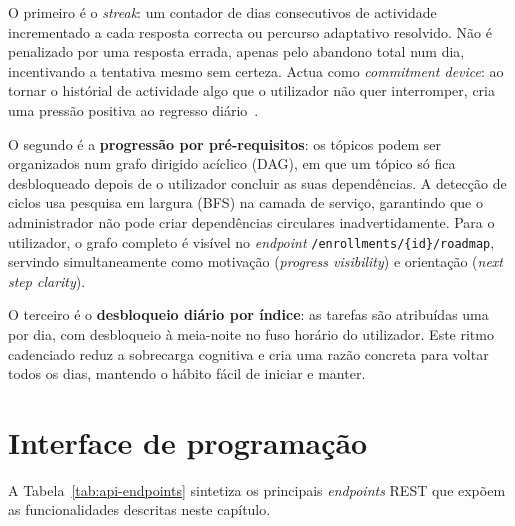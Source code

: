 O primeiro \'e o \emph{streak}: um contador de dias consecutivos de actividade
incrementado a cada resposta correcta ou percurso adaptativo resolvido. N\~ao
\'e penalizado por uma resposta errada, apenas pelo abandono total num dia,
incentivando a tentativa mesmo sem certeza. Actua como \emph{commitment device}:
ao tornar o hist\'orial de actividade algo que o utilizador n\~ao quer
interromper, cria uma press\~ao positiva ao regresso di\'ario~\cite{ott2019gamification}.

O segundo \'e a \textbf{progress\~ao por pr\'e-requisitos}: os t\'opicos
podem ser organizados num grafo dirigido ac\'iclico (DAG), em que um t\'opico
s\'o fica desbloqueado depois de o utilizador concluir as suas depend\^encias.
A detec\c{c}\~ao de ciclos usa pesquisa em largura (BFS) na camada de servi\c{c}o,
garantindo que o administrador n\~ao pode criar depend\^encias circulares
inadvertidamente. Para o utilizador, o grafo completo \'e vis\'ivel no
\emph{endpoint} \texttt{/enrollments/\{id\}/roadmap}, servindo simultaneamente
como motiva\c{c}\~ao (\emph{progress visibility}) e orienta\c{c}\~ao
(\emph{next step clarity}).

O terceiro \'e o \textbf{desbloqueio di\'ario por \'indice}: as tarefas s\~ao
atribu\'idas uma por dia, com desbloqueio \`a meia-noite no fuso hor\'ario do
utilizador. Este ritmo cadenciado reduz a sobrecarga cognitiva e cria uma
raz\~ao concreta para voltar todos os dias, mantendo o h\'abito f\'acil de
iniciar e manter.

\section{Interface de programa\c{c}\~ao}
\label{sec:api}

A Tabela~\ref{tab:api-endpoints} sintetiza os principais \emph{endpoints}
REST que exp\~oem as funcionalidades descritas neste cap\'itulo.

